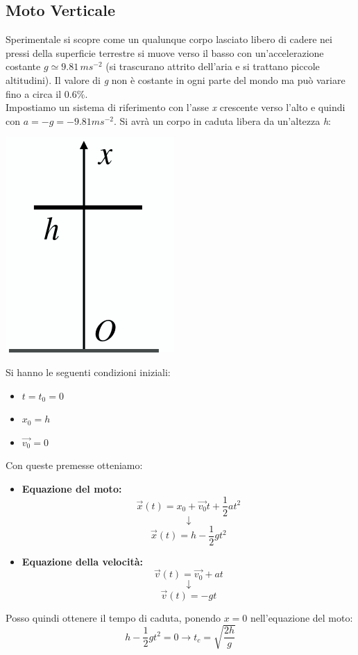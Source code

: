 \documentclass[a4paper,12pt, oneside]{book}
\begin{document}
\subsection{Moto Verticale}
Sperimentale si scopre come un qualunque corpo lasciato libero di cadere nei pressi della superficie terrestre si muove verso il basso con un'accelerazione costante $g\simeq 9.81\, ms^{-2}$ (si trascurano attrito dell'aria e si trattano piccole altitudini). Il valore di \textit{g} non è costante in ogni parte del mondo ma può variare fino a circa il $0.6\%$.\\
Impostiamo un sistema di riferimento con l'asse \textit{x} crescente verso l'alto e quindi con $a=-g=-9.81 ms^{-2}$. Si avrà un corpo in caduta libera da un'altezza \textit{h}:
\begin{center}
\includegraphics[scale=0.3]{img/vert.png}
\end{center}
Si hanno le seguenti condizioni iniziali:
\begin{itemize}
\item $t=t_0=0$
\item $x_0=h$
\item $\vec{v_0}=0$
\end{itemize}
Con queste premesse otteniamo:
\begin{itemize}
\item \textbf{Equazione del moto:}
$$\vec{x}(t)=x_0+\vec{v_0} t+\frac{1}{2} a  t^2$$
$$\downarrow$$
$$\vec{x}(t)=h-\frac{1}{2} g t^2$$
\item \textbf{Equazione della velocità:}
$$\vec{v}(t)=\vec{v_0}+a t$$
$$\downarrow$$
$$\vec{v}(t)=-g t$$
\end{itemize}
Posso quindi ottenere il tempo di caduta, ponendo $x=0$ nell'equazione del moto:
$$h-\frac{1}{2} g t^2=0\rightarrow t_c=\sqrt{\frac{2 h}{g}}$$
\end{document}
